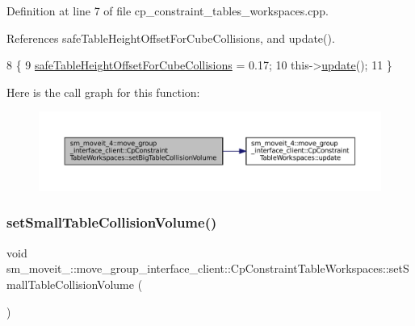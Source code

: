Definition at line 7 of file cp\+\_\+constraint\+\_\+tables\+\_\+workspaces.\+cpp.



References safe\+Table\+Height\+Offset\+For\+Cube\+Collisions, and update().


\begin{DoxyCode}
8         \{
9             \hyperlink{classsm__moveit__4_1_1move__group__interface__client_1_1CpConstraintTableWorkspaces_a3f9ba91578890ba9a146c678e3630d9f}{safeTableHeightOffsetForCubeCollisions} = 0.17;
10             this->\hyperlink{classsm__moveit__4_1_1move__group__interface__client_1_1CpConstraintTableWorkspaces_a7d7ed0c25f8d40392a977160ae3123a7}{update}();
11         \}
\end{DoxyCode}
Here is the call graph for this function\+:
\nopagebreak
\begin{figure}[H]
\begin{center}
\leavevmode
\includegraphics[width=350pt]{classsm__moveit__4_1_1move__group__interface__client_1_1CpConstraintTableWorkspaces_a6f957ed21a9ea01327d3c7c4ebbebe81_cgraph}
\end{center}
\end{figure}
\mbox{\label{classsm__moveit__4_1_1move__group__interface__client_1_1CpConstraintTableWorkspaces_a0d343583b5ea3e9bc9df4779fe85d805}} 
\subsubsection{\texorpdfstring{set\+Small\+Table\+Collision\+Volume()}{setSmallTableCollisionVolume()}}
{\footnotesize\ttfamily void sm\+\_\+moveit\+\_\+::move\+\_\+group\+\_\+interface\+\_\+client\+::\+Cp\+Constraint\+Table\+Workspaces\+::set\+Small\+Table\+Collision\+Volume (\begin{DoxyParamCaption}{ }\end{DoxyParamCaption})}



